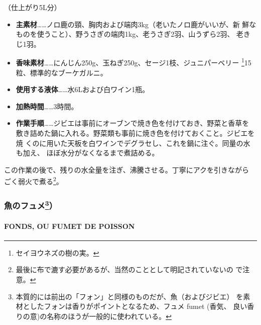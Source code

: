 \begin{recette}
（仕上がり5L分）

\begin{itemize}
\item
  \textbf{主素材}\ldots{}\ldots{}ノロ鹿の頸、胸肉および端肉3kg（老いたノロ鹿がいいが、新
  鮮なものを使うこと）、野うさぎの端肉1kg、老うさぎ2羽、山うずら2羽、
  老きじ1羽。
\item
  \textbf{香味素材}\ldots{}\ldots{}にんじん250g、玉ねぎ250g、セージ1枝、ジュニパーベリー
  \footnote{セイヨウネズの樹の実。}15粒、標準的なブーケガルニ。
\end{itemize}

\begin{itemize}
\item
  \textbf{使用する液体}\ldots{}\ldots{}水6Lおよび白ワイン1瓶。
\item
  \textbf{加熱時間}\ldots{}\ldots{}3時間。
\item
  \textbf{作業手順}\ldots{}\ldots{}ジビエは事前にオーブンで焼き色を付けておき、野菜と香草を
  敷き詰めた鍋に入れる。野菜類も事前に焼き色を付けておくこと。ジビエを焼
  くのに用いた天板を白ワインでデグラセし、これを鍋に注ぐ。同量の水も加え、
  ほぼ水分がなくなるまで煮詰める。
\end{itemize}

この作業の後で、残りの水全量を注ぎ、沸騰させる。丁寧にアクを引きながら
ごく弱火で煮る\footnote{最後に布で漉す必要があるが、当然のこととして明記されていないの
  で注意。}。

\maeaki

\hypertarget{ux9b5aux306eux30d5ux30e5ux30e11010013}{%
\subsubsection[魚のフュメ）]{\texorpdfstring{魚のフュメ\footnote{本質的には前出の「フォン」と同様のものだが、魚（およびジビエ）
  を素材としたフォンは香りがポイントとなるため、フュメ fumet (香気、
  良い香りの意)の名称のほうが一般的に使われている。}）}{魚のフュメ）}}\label{ux9b5aux306eux30d5ux30e5ux30e11010013}}

\hypertarget{fumet-de-poisson}{%
\paragraph{FONDS, OU FUMET DE POISSON}\label{fumet-de-poisson}}



\end{recette}
